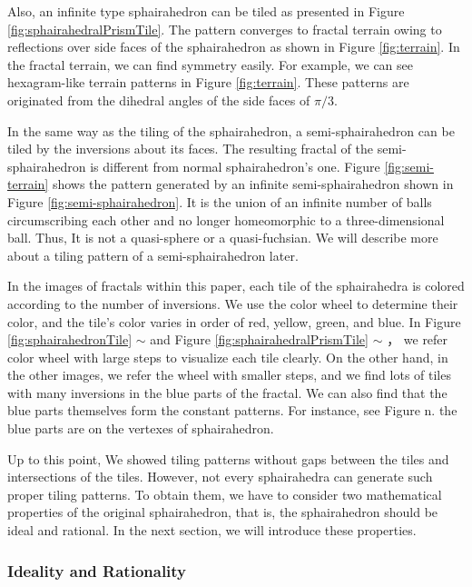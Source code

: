 \noindent
Also, an infinite type sphairahedron can be tiled as presented in Figure
\ref{fig:sphairahedralPrismTile}.
The pattern converges to fractal terrain owing to reflections over side
faces of the sphairahedron as shown in Figure \ref{fig:terrain}.
In the fractal terrain, we can find symmetry easily.
For example, we can see hexagram-like terrain patterns in Figure
\ref{fig:terrain}.
These patterns are originated from the dihedral angles of the side faces of
$\pi / 3$.

In the same way as the tiling of the sphairahedron, a semi-sphairahedron
can be tiled by the inversions about its faces.
The resulting fractal of the semi-sphairahedron is different from normal
sphairahedron's one.
Figure \ref{fig:semi-terrain} shows the pattern
generated by an infinite semi-sphairahedron shown in Figure 
\ref{fig:semi-sphairahedron}.
It is the union of an infinite number of balls
circumscribing each other and no longer homeomorphic
to a three-dimensional ball.
Thus, It is not a quasi-sphere or a quasi-fuchsian.
We will describe more about a tiling pattern of a semi-sphairahedron later.

In the images of fractals within this paper, each tile of the
sphairahedra is colored according to the
number of inversions.
We use the color wheel to determine their color,
and the tile's color varies in order of red, yellow, green, and blue.
In Figure \ref{fig:sphairahedronTile}  $\sim$
 and
Figure  \ref{fig:sphairahedralPrismTile} 
$\sim$ ，
we refer color wheel with large steps to visualize each tile clearly.
On the other hand, in the other images, we refer the wheel with smaller
steps, and we find lots of tiles with many inversions in the blue
parts of the fractal.
We can also find that the blue parts themselves form the constant
patterns.
For instance, see Figure n. the blue parts are on the vertexes of
sphairahedron.

Up to this point, We showed tiling patterns without gaps between the tiles and
intersections of the tiles.
However, not every sphairahedra can generate such proper tiling patterns.
To obtain them, we have to consider two mathematical properties
of the original sphairahedron, that is, the sphairahedron should be
ideal and rational.
In the next section, we will introduce these properties.

\subsubsection{Ideality and Rationality}


